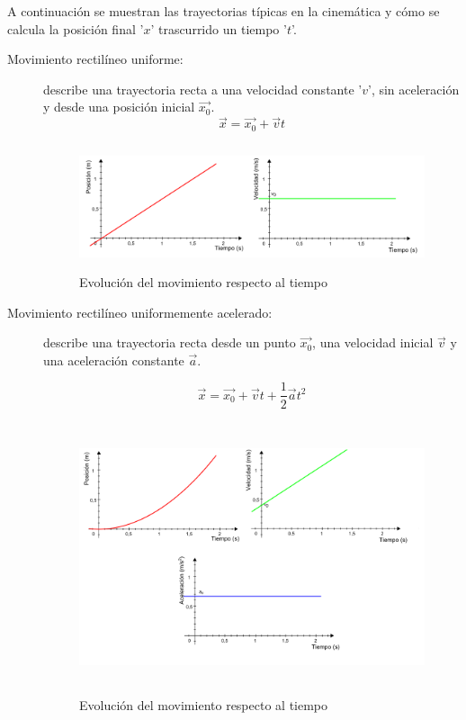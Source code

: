 A continuación se muestran las trayectorias típicas en la cinemática y cómo se calcula la posición final '$x$' trascurrido un tiempo '$t$'.

\begin{description}
\item [Movimiento rectilíneo uniforme:] describe una trayectoria recta a una velocidad constante '$v$', sin aceleración y desde una posición inicial $\vec{x_0}$.
$$ \vec{x} = \vec{x_0} + \vec{v}t $$

\begin{figure}[!h]
	\centering	
         \includegraphics[height=3.7cm]{img/Cinematica_MRU.png}
	\caption{Evolución del movimiento respecto al tiempo}
\end{figure}

\item [Movimiento rectilíneo uniformemente acelerado:] describe una trayectoria recta desde un punto $\vec{x_0}$, una velocidad inicial $\vec{v}$ y una aceleración constante $\vec{a}$.

$$ \vec{x} = \vec{x_0} + \vec{v} t + \frac{1}{2} \vec{a}  t^2 $$

\begin{figure}[!h]
	\centering	
        \includegraphics[height=8cm]{img/Cinematica_MRUA.png}
	\caption{Evolución del movimiento respecto al tiempo}
\end{figure}


\end{description}
